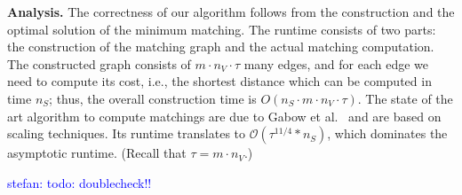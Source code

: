 \documentclass[9pt]{sigcomm-alternate}
\newcommand{\maciek}[1]{\textcolor{brown}{maciek: #1}}
\newcommand{\stefan}[1]{\textcolor{blue}{stefan: #1}}
\newcommand{\MaFactor}{m}
\newcommand{\ChunkType}{\tau}
\begin{document}
\textbf{Analysis.}
The correctness of our algorithm follows from the construction and the optimal
solution of the minimum matching. 
The runtime consists of two parts: the construction of the matching graph and
the actual matching computation. The constructed graph consists of
$\MaFactor \cdot n_V \cdot \ChunkType$ many edges,
and for each edge we need to compute its cost, i.e., the shortest distance
which can be computed in time $n_S$; thus, the overall construction time
is $O(n_S \cdot \MaFactor \cdot n_V \cdot \ChunkType)$.
The state of the art algorithm to compute matchings are due to Gabow et al.~\cite{gabow_scaling_algorithm}
and are based on scaling techniques. 
Its runtime translates to 
$\mathcal{O}(\tau^{11/4}*n_S)$, which dominates the asymptotic runtime. (Recall that $\tau = \MaFactor\cdot n_V$.)

\stefan{todo: doublecheck!!}

\end{document}
